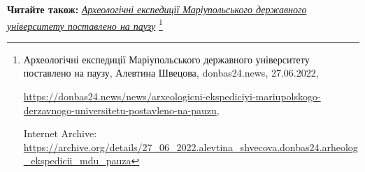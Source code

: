  
 
 
 
 


\textbf{Читайте також:} \href{https://archive.org/details/27_06_2022.alevtina_shvecova.donbas24.arheolog_ekspedicii_mdu_pauza}{\emph{Археологічні експедиції Маріупольського державного університету поставлено на паузу}}%
\footnote{Археологічні експедиції Маріупольського державного університету поставлено на паузу, Алевтина Швецова, donbas24.news, 27.06.2022, \par%
\url{https://donbas24.news/news/arxeologicni-ekspediciyi-mariupolskogo-derzavnogo-universitetu-postavleno-na-pauzu}, \par%
Internet Archive: \url{https://archive.org/details/27_06_2022.alevtina_shvecova.donbas24.arheolog_ekspedicii_mdu_pauza}%
}
